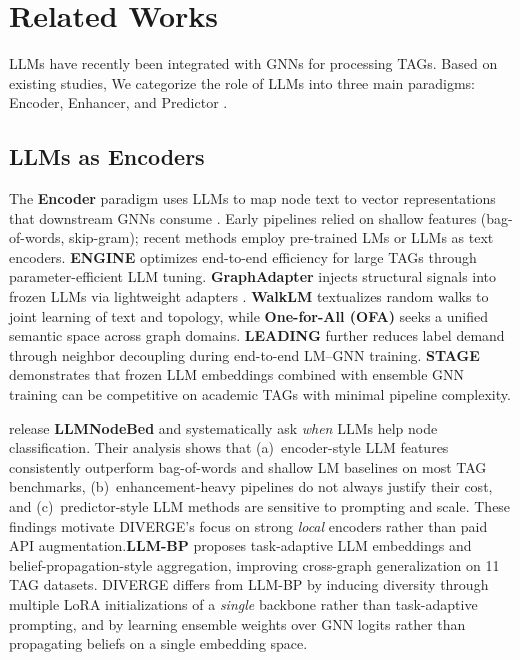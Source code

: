 \documentclass[a4paper,fleqn]{cas-sc}
\begin{document}
\section{Related Works}\label{sec:relatedWork}
LLMs have recently been integrated with GNNs for processing TAGs. Based on existing studies, We categorize the role of LLMs into three main paradigms: Encoder, Enhancer, and Predictor \citep{Wu2025LLMNode, Jin2023LLMGraphs, Chen2024LLMGraphs, Li2024GraphLLMSurvey}.

\subsection{LLMs as Encoders}
The \textbf{Encoder} paradigm uses LLMs to map node text to vector representations that downstream GNNs consume \citep{he2024harnessing, Huang2024GNNAdapters, Zhu2024EfficientTextualGraphs}. Early pipelines relied on shallow features (bag-of-words, skip-gram); recent methods employ pre-trained LMs or LLMs as text encoders. \textbf{ENGINE} \citep{Zhu2024EfficientTextualGraphs} optimizes end-to-end efficiency for large TAGs through parameter-efficient LLM tuning. \textbf{GraphAdapter} \citep{Huang2024GNNAdapters} injects structural signals into frozen LLMs via lightweight adapters \citep{Houlsby2019Adapters}. \textbf{WalkLM} \citep{Tan2023WalkLM} textualizes random walks to joint learning of text and topology, while \textbf{One-for-All (OFA)} \citep{liu2024oneforall} seeks a unified semantic space across graph domains. \textbf{LEADING} \citep{Xue2025LEADING} further reduces label demand through neighbor decoupling during end-to-end LM--GNN training. \textbf{STAGE} \citep{zolnai-lucas-etal-2024-stage} demonstrates that frozen LLM embeddings combined with ensemble GNN training can be competitive on academic TAGs with minimal pipeline complexity.

\citet{Wu2025LLMNode} release \textbf{LLMNodeBed} and systematically ask \emph{when} LLMs help node classification. Their analysis shows that (a)~encoder-style LLM features consistently outperform bag-of-words and shallow LM baselines on most TAG benchmarks, (b)~enhancement-heavy pipelines do not always justify their cost, and (c)~predictor-style LLM methods are sensitive to prompting and scale. These findings motivate DIVERGE's focus on strong \emph{local} encoders rather than paid API augmentation.\textbf{LLM-BP} \citep{wang2025llmbp} proposes task-adaptive LLM embeddings and belief-propagation-style aggregation, improving cross-graph generalization on 11 TAG datasets. DIVERGE differs from LLM-BP by inducing diversity through multiple LoRA initializations of a \emph{single} backbone rather than task-adaptive prompting, and by learning ensemble weights over GNN logits rather than propagating beliefs on a single embedding space.
\end{document}
